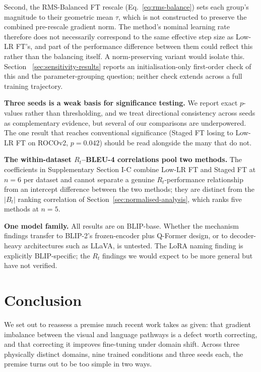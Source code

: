 \documentclass[journal]{IEEEtran}
\begin{document}
Second, the RMS-Balanced FT rescale (Eq.~\ref{eq:rms-balance})
sets each group's magnitude to their geometric mean $\tau$, which
is not constructed to preserve the combined pre-rescale gradient
norm. The method's nominal learning rate therefore does not
necessarily correspond to the same effective step size as
Low-LR FT's, and part of the performance difference between them
could reflect this rather than the balancing itself. A norm-preserving variant would isolate this. Section ~\ref{sec:sensitivity-results} reports an initialisation-only first-order check of this and the parameter-grouping question; neither check extends across a full training trajectory.

\textbf{Three seeds is a weak basis for significance testing.}
We report exact $p$-values rather than thresholding, and we treat
directional consistency across seeds as complementary evidence,
but several of our comparisons are underpowered. The one result
that reaches conventional significance (Staged FT losing to
Low-LR FT on ROCOv2, $p{=}0.042$) should be read alongside the
many that do not.

\textbf{The within-dataset $R_t$--BLEU-4 correlations pool two
methods.} The coefficients in Supplementary Section I-C combine
Low-LR FT and Staged FT at $n{=}6$ per dataset and cannot separate a genuine $R_t$-performance relationship from an intercept difference between the two methods; they are distinct from the $\lvert B_t \rvert$ ranking correlation of
Section~\ref{sec:normalised-analysis}, which ranks five methods at
$n{=}5$.

\textbf{One model family.} All results are on BLIP-base.
Whether the mechanism findings transfer to BLIP-2's frozen-encoder plus Q-Former design, or to decoder-heavy architectures such as LLaVA, is untested. The LoRA naming finding is explicitly
BLIP-specific; the $R_t$ findings we would expect to be more
general but have not verified.

\section{Conclusion}

We set out to reassess a premise much recent work takes as given: that
gradient imbalance between the visual and language pathways is a
defect worth correcting, and that correcting it improves fine-tuning
under domain shift. Across three physically distinct domains, nine
trained conditions and three seeds each, the premise turns out to be
too simple in two ways.
\end{document}
